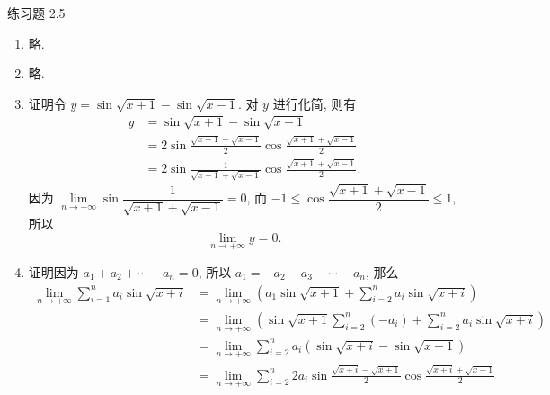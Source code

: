 



% 


\begin{center}
    {\heiti 练习题 2.5}
\end{center}

\begin{enumerate}
    \item %
        略.
    \item %
        略.
    \item %
        {\heiti 证明}\quad 令 $y = \sin\sqrt{x + 1} - \sin\sqrt{x-1}$. 对 $y$ 进行化简, 则有
        \begin{align*}
            y &= \sin\sqrt{x + 1} - \sin\sqrt{x-1} \\
              &= 2\sin\frac{\sqrt{x+1} - \sqrt{x-1}}{2}\cos\frac{\sqrt{x+1} + \sqrt{x-1}}{2} \\
              &= 2\sin\frac{1}{\sqrt{x+1} + \sqrt{x-1}}\cos\frac{\sqrt{x+1} + \sqrt{x-1}}{2}.
        \end{align*}
        因为 $\lim\limits_{n\to+\infty}\sin\dfrac{1}{\sqrt{x+1} + \sqrt{x-1}} = 0$, 而 $-1 \leqslant \cos\dfrac{\sqrt{x+1} + \sqrt{x-1}}{2} \leqslant 1$, 所以
        \[
            \lim_{n\to+\infty} y = 0.    
        \]
    \item %
        {\heiti 证明}\quad 因为 $a_1 + a_2 + \cdots + a_n = 0$, 所以 $a_1 = -a_2 - a_3 - \cdots - a_n$, 那么
        \begin{align*}
            \lim_{n\to+\infty}\sum_{i=1}^n a_i\sin\sqrt{x+i} &= \lim_{n\to+\infty}\left(a_1\sin\sqrt{x+1} + \sum_{i=2}^n a_i\sin\sqrt{x+i}\right) \\
                                                             &= \lim_{n\to+\infty}\left(\sin\sqrt{x+1}\sum_{i=2}^n(-a_i) + \sum_{i=2}^n a_i\sin\sqrt{x+i}\right) \\
                                                             &= \lim_{n\to+\infty}\sum_{i=2}^n a_i(\sin\sqrt{x+i} - \sin\sqrt{x+1}) \\
                                                             &= \lim_{n\to+\infty}\sum_{i=2}^n 2a_i\sin\frac{\sqrt{x+i} - \sqrt{x+1}}{2}\cos\frac{\sqrt{x+i} + \sqrt{x+1}}{2} \\

\end{align*}
\end{enumerate}
